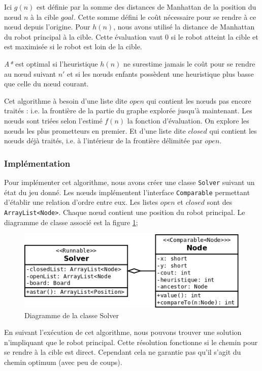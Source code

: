 \documentclass[a4paper]{article} %
\begin{document}
Ici $g(n)$ est définie par la somme des distances de Manhattan de la position du nœud $n$ à la cible $goal$. Cette somme défini le coût nécessaire pour se rendre à ce nœud depuis l'origine.
Pour $h(n)$, nous avons utilisé la distance de Manhattan du robot principal à la cible. Cette évaluation vaut 0 si le robot atteint la cible et est maximisée si le robot est loin de la cible.%

\textsl{A*} est optimal si l'heuristique $h(n)$ ne surestime jamais le coût pour se rendre au nœud suivant $n'$ et si les nœuds enfants possèdent une heuristique plus basse que celle du nœud courant.

Cet algorithme à besoin d'une liste dite $open$ qui contient les nœuds pas encore traités : i.e. la frontière de la partie du graphe explorée jusqu'à maintenant. Les nœuds sont triées selon l'estimé $f(n)$ la fonction d'évaluation. On explore les nœuds les plus prometteurs en premier. Et d'une liste dite $closed$ qui contient les nœuds déjà traités, i.e. à l'intérieur de la frontière délimitée par $open$.

	\subsubsection{Implémentation}
Pour implémenter cet algorithme, nous avons créer une classe \texttt{Solver} suivant un état du jeu donné. Les nœuds implémentent l'interface \texttt{Comparable} permettant d'établir une relation d'ordre entre eux. Les listes $open$ et $closed$ sont des \texttt{ArrayList<Node>}. Chaque nœud contient une position du robot principal.
Le diagramme de classe associé est la figure \ref{solverDiag};

\begin{figure}[htpb]
	\begin{center}
	\includegraphics[scale=0.4]{./images/solver.png}
	\caption{Diagramme de la classe Solver}\label{solverDiag}
	\end{center}
\end{figure}

En suivant l'exécution de cet algorithme, nous pouvons trouver une solution n'impliquant que le robot principal. Cette résolution fonctionne si le chemin pour se rendre à la cible est direct. Cependant cela ne garantie pas qu'il s'agit du chemin optimum (avec peu de coups).
\end{document}
